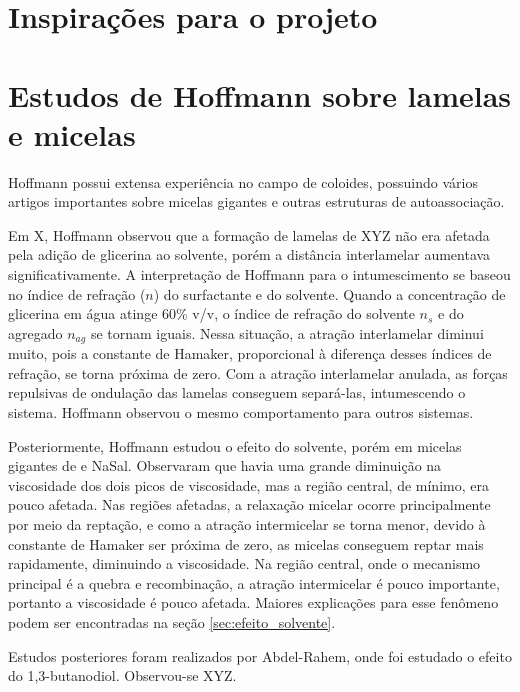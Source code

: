	
	\chapter{Inspirações para o projeto}
		\chapter{Estudos de Hoffmann sobre lamelas e micelas}
		Hoffmann possui extensa experiência no campo de coloides, possuindo vários artigos importantes sobre micelas gigantes e outras estruturas de autoassociação.
		
		Em X, Hoffmann observou que a formação de lamelas de XYZ não era afetada pela adição de glicerina ao solvente, porém a distância interlamelar aumentava significativamente. A interpretação de Hoffmann para o intumescimento se baseou no índice de refração (\(n\)) do surfactante e do solvente. Quando a concentração de glicerina em água atinge 60\% v/v, o índice de refração do solvente \(n_s\) e do agregado \(n_{ag}\) se tornam iguais. Nessa situação, a atração interlamelar diminui muito, pois a constante de Hamaker, proporcional à diferença desses índices de refração, se torna próxima de zero. Com a atração interlamelar anulada, as forças repulsivas de ondulação das lamelas conseguem separá-las, intumescendo o sistema. Hoffmann observou o mesmo comportamento para outros sistemas. 
				
		
		Posteriormente, Hoffmann estudou o efeito do solvente, porém em micelas gigantes de \CTAB{} e NaSal. Observaram que havia uma grande diminuição na viscosidade dos dois picos de viscosidade, mas a região central, de mínimo, era pouco afetada. Nas regiões afetadas, a relaxação micelar ocorre principalmente por meio da reptação, e como a atração intermicelar se torna menor, devido à constante de Hamaker ser próxima de zero, as micelas conseguem reptar mais rapidamente, diminuindo a viscosidade. Na região central, onde o mecanismo principal é a quebra e recombinação, a atração intermicelar é pouco importante, portanto a viscosidade é pouco afetada. Maiores explicações para esse fenômeno podem ser encontradas na seção \ref{sec:efeito_solvente}.
		
		Estudos posteriores foram realizados por Abdel-Rahem, onde foi estudado o efeito do 1,3-butanodiol. Observou-se XYZ.
		

